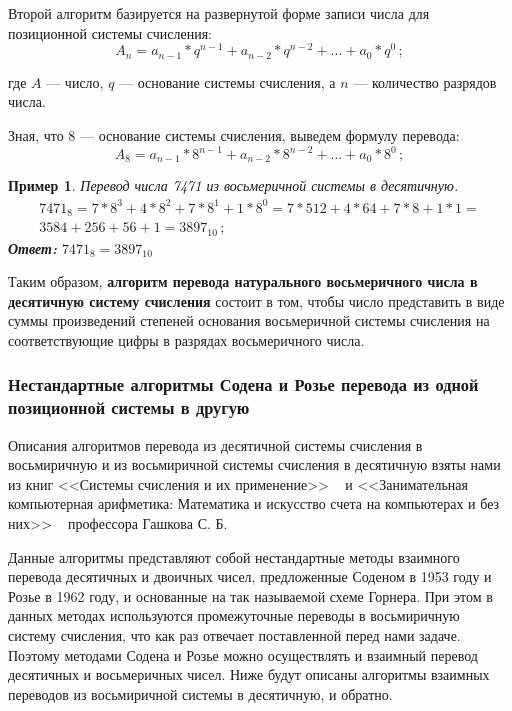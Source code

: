 \documentclass[14pt, russian]{scrartcl}
\newcounter{cExample}
\newtheorem{Example}{Пример}[cExample]
\begin{document}
Второй алгоритм базируется на развернутой форме записи числа для позиционной системы счисления:
\label{Example:MathFont}
\begin{equation}\label{eq:1}
A_n = a_{n-1} * q^{n-1} + a_{n-2} * q^{n-2} + ... + a_0 * q^0\,;
\end{equation} 

где $A$ — число, $q$ — основание системы счисления, а $n$ — количество разрядов числа.

Зная, что 8 — основание системы счисления, выведем формулу перевода:
\label{Example:MathFont2}
\begin{equation}\label{eq:2}
A_8 = a_{n-1} * 8^{n-1} + a_{n-2} * 8^{n-2} + ... + a_0 * 8^0\,;
\end{equation}

\newpage
\begin{Example}\label{Example:MathFont3}
Перевод числа 7471 из восьмеричной системы в десятичную. 
\begin{equation*}\label{eq:3}
\begin{aligned}
7471_8= 7 * 8^3 + 4 * 8^2 + 7 * 8^1 + 1 * 8^0 = 7 * 512 + 4 * 64 + 7 * 8 + 1 * 1 = \\
3584 + 256 + 56 + 1 = 3897_{10}\,;
\end{aligned}
\end{equation*}
\textbf{Ответ:} $7471_8 = 3897_{10}$ 
\end{Example} 


\vspace{1em}
Таким образом, \textbf{алгоритм перевода натурального восьмеричного числа в десятичную систему счисления} состоит в том, чтобы число представить в виде суммы произведений степеней основания восьмеричной системы счисления на соответствующие цифры в разрядах восьмеричного числа.

\subsubsection{Нестандартные алгоритмы Содена и Розье перевода из одной позиционной системы в другую}

Описания алгоритмов перевода из десятичной системы счисления в восьмиричную и из восьмиричной системы счисления в десятичную взяты нами из книг <<Системы счисления и их применение>> ~\cite{CountSystems} и <<Занимательная компьютерная арифметика: Математика и искусство счета на компьютерах и без них>> ~\cite{ComputerArithm} профессора Гашкова С. Б.

Данные алгоритмы представляют собой нестандартные методы взаимного перевода десятичных и двоичных чисел, предложенные Соденом в 1953 году и Розье в 1962 году, и основанные на так называемой схеме Горнера. При этом в данных методах используются промежуточные переводы в восьмиричную систему счисления, что как раз отвечает поставленной перед нами задаче. Поэтому методами Содена и Розье можно осуществлять и взаимный перевод десятичных и восьмеричных чисел. Ниже будут описаны алгоритмы взаимных переводов из восьмиричной системы в десятичную, и обратно.
\end{document}
